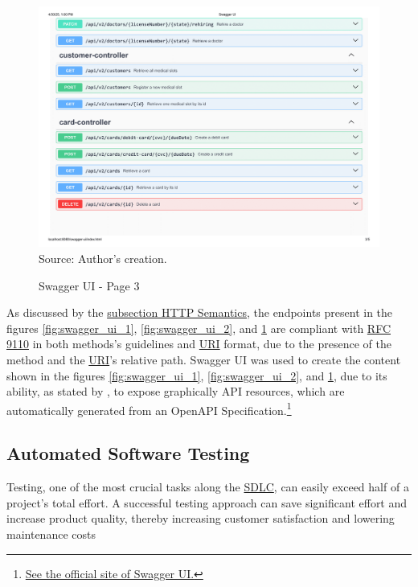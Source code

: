 \begin{figure}[H]
	\centering
		\caption{Swagger UI - Page 3}
		\includegraphics[width=0.83\linewidth]{figures/swagger_ui_3.png}
		\label{fig:swagger_ui_3}
		\\ \footnotesize Source: Author's creation.
\end{figure}

As discussed by the \hyperref[subsection:http_semantics]{subsection HTTP Semantics}, the endpoints present in the figures \ref{fig:swagger_ui_1}, 
\ref{fig:swagger_ui_2}, and \ref{fig:swagger_ui_3} are compliant with \hyperref[appendix:glossary]{RFC} \href{https://www.rfc-editor.org/rfc/rfc9110.html}{9110} in both methods's guidelines and \hyperref[appendix:glossary]{URI} format, due to the presence of the method and the \hyperref[appendix:glossary]{URI}'s relative path. Swagger UI was used to create the content shown in the figures \ref{fig:swagger_ui_1}, \ref{fig:swagger_ui_2}, and \ref{fig:swagger_ui_3}, due to its ability, as stated by \cite{mcnamara2022flexible}, to expose graphically API resources, which are automatically generated from an OpenAPI Specification.\footnote{\href{https://swagger.io/tools/swagger-ui/}{See the official site of Swagger UI.}}

\subsection{Automated Software Testing}
\label{subsection:automated_software_testing}

Testing, one of the most crucial tasks along the \hyperref[appendix:glossary]{SDLC}, can easily exceed half of a project’s total effort. A successful testing approach can save significant effort and increase product quality, thereby increasing customer satisfaction and lowering maintenance costs \cite{juristo2006guest, tuteja2012research}

